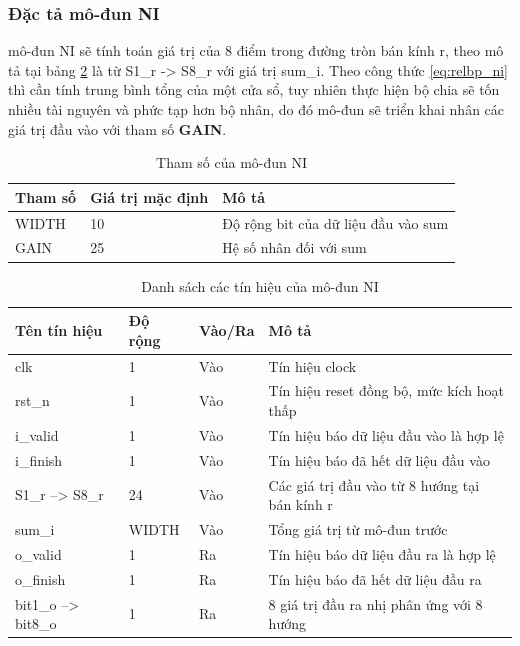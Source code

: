 \subsubsection{Đặc tả mô-đun NI}
mô-đun NI sẽ tính toán giá trị của 8 điểm trong đường tròn bán kính r, theo mô tả tại bảng \ref{tab:signalListNI} là từ S1\_r -> S8\_r với giá trị sum\_i. Theo công thức \ref{eq:relbp_ni} thì cần tính trung bình tổng của một cửa sổ, tuy nhiên thực hiện bộ chia sẽ tốn nhiều tài nguyên và phức tạp hơn bộ nhân, do đó mô-đun sẽ triển khai nhân các giá trị đầu vào với tham số \textbf{GAIN}.
\begin{table}[!ht]
    \centering
    \renewcommand{\arraystretch}{1.3} %
        \caption{Tham số của mô-đun NI}
    \begin{tabular}{|p{3cm} p{4cm} p{8cm}|}
        \hline
        \rowcolor{gray!30}
        \textbf{Tham số } & \textbf{Giá trị mặc định}  & \textbf{Mô tả} \\
        \hline
        WIDTH & 10 & Độ rộng bit của dữ liệu đầu vào sum
        \\ \hline
        GAIN & 25 & Hệ số nhân đối với sum
        \\
        \hline
    \end{tabular}

    \label{tab:paramListNI}
\end{table}
\begin{table}[!ht]
    \centering
    \renewcommand{\arraystretch}{1.3} %
        \caption{Danh sách các tín hiệu của mô-đun NI}
    \begin{tabular}{|p{3cm} p{2cm} p{2cm} p{8cm}|}
        \hline
        \rowcolor{gray!30}
        \textbf{Tên tín hiệu} & \textbf{Độ rộng} & \textbf{Vào/Ra} & \textbf{Mô tả} \\
        \hline
        clk & 1 & Vào & Tín hiệu clock \\
        \hline
        rst\_n & 1 & Vào & Tín hiệu reset đồng bộ, mức kích hoạt thấp \\
        \hline
        i\_valid & 1 & Vào & Tín hiệu báo dữ liệu đầu vào là hợp lệ \\
        \hline
        i\_finish & 1 & Vào & Tín hiệu báo đã hết dữ liệu đầu vào \\
        \hline
        S1\_r --> S8\_r & 24 & Vào & Các giá trị đầu vào từ 8 hướng tại bán kính r\\
        \hline
        sum\_i & WIDTH & Vào & Tổng giá trị từ mô-đun trước \\
        \hline
        o\_valid & 1 & Ra & Tín hiệu báo dữ liệu đầu ra là hợp lệ\\
        \hline
        o\_finish & 1 & Ra & Tín hiệu báo đã hết dữ liệu đầu ra \\
        \hline
        bit1\_o --> bit8\_o & 1 & Ra & 8 giá trị đầu ra nhị phân ứng với 8 hướng \\
        \hline
    \end{tabular}

    \label{tab:signalListNI}
\end{table}

